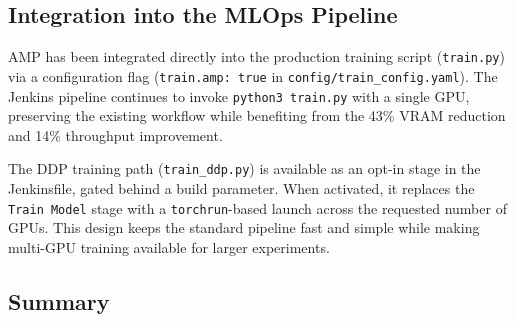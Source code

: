 \subsection{Integration into the MLOps Pipeline}

AMP has been integrated directly into the production training script
(\texttt{train.py}) via a configuration flag (\texttt{train.amp: true}
in \texttt{config/train\_config.yaml}). The Jenkins pipeline continues
to invoke \texttt{python3 train.py} with a single GPU, preserving the
existing workflow while benefiting from the 43\% VRAM reduction and 14\%
throughput improvement.

The DDP training path (\texttt{train\_ddp.py}) is available as an
opt-in stage in the Jenkinsfile, gated behind a build parameter. When
activated, it replaces the \texttt{Train Model} stage with a
\texttt{torchrun}-based launch across the requested number of GPUs.
This design keeps the standard pipeline fast and simple while making
multi-GPU training available for larger experiments.

\subsection{Summary}

